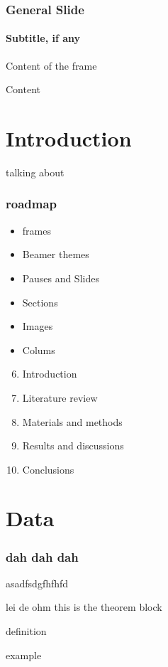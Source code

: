 \begin{frame}

\frametitle{General Slide}
\framesubtitle{Subtitle, if any}
Content of the frame

\end{frame}




\begin{frame}{Content}
\tableofcontents
\end{frame}




\section{Introduction}




\begin{frame}{talking about}

\frametitle{roadmap}

\begin{itemize}
\item frames
\pause
\item Beamer themes
\item Pauses and Slides
\item Sections
\item Images
\item Colums
\end{itemize}

\begin{enumerate}
\setcounter{enumi}{5}
\itemsep0.75em
\item <1> Introduction
\item Literature review
\item Materials and methods
\item Results and discussions
\item Conclusions
\end{enumerate}

\end{frame}

\section{Data}

\begin{frame}
\frametitle{dah dah dah}

asadfsdgfhfhfd

\begin{theorem}{lei de ohm}
this is the theorem block
\end{theorem}
\begin{definition}
definition
\end{definition}
\begin{example}
example
\end{example}

\end{frame}

